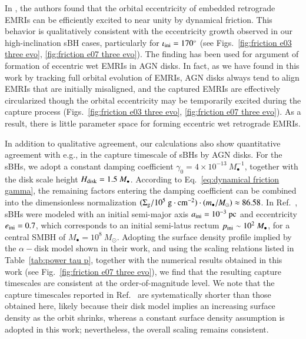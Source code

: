 \documentclass[aps,prx,reprint,superscriptaddress,nofootinbib,longbibliography]{revtex4-1}
\begin{document}
In \cite{Secunda_2021},  the authors found that the orbital eccentricity of embedded retrograde EMRIs can be efficiently excited to near unity by dynamical friction. This behavior is qualitatively consistent with the eccentricity growth observed in our high-inclination sBH cases, particularly for $\iota_{\rm ini}=170^{\circ}$ (see Figs.~\ref{fig:friction e03 three evo}, \ref{fig:friction e07 three evo}).
The finding has been used for argument of formation of eccentric wet EMRIs in AGN disks. In fact, as we have found in this work by tracking full orbital evolution of EMRIs,  AGN disks always tend to align EMRIs that are initially misaligned, and the captured EMRIs are effectively circularized though the orbital eccentricity may be temporarily excited during the capture process (Figs.~\ref{fig:friction e03 three evo}, \ref{fig:friction e07 three evo}).  As a result, there is little parameter space for forming eccentric wet retrograde EMRIs. 
\par
In addition to qualitative agreement, our calculations also show quantitative agreement with \cite{Wang2024} e.g., in the capture timescale of sBHs by AGN disks. 
For the sBHs, we adopt a constant damping coefficient $\gamma_{0}=4\times 10^{-13}\ M_{\bullet}^{-1}$, together with the disk scale height $H_{\rm disk}=1.5\ M_{\bullet}$. According to Eq.~\eqref{eq:dynamical friction gamma}, the remaining factors entering the damping coefficient can be combined into the dimensionless normalization $(\Sigma_{\rm g}/10^5\ \mathrm{g\cdot cm^{-2}})\cdot(m_{\bullet}/M_{\odot})\approx 86.58$. In Ref.~\cite{Wang2024}, sBHs were modeled with an initial semi-major axis $a_{\rm ini}=10^{-3}\ \mathrm{pc}$ and eccentricity $e_{\rm ini}=0.7$, which corresponds to an initial semi-latus rectum $p_{\rm ini}\sim 10^2\ M_{\bullet}$, for a central SMBH of $M_{\bullet}=10^{8}\ M_{\odot}$.
Adopting the surface density profile implied by the $\alpha-$disk model shown in their work, and using the scaling relations listed in Table~\ref{tab:power tau p}, together with the numerical results obtained in this work (see Fig.~\ref{fig:friction e07 three evo}), we find that the resulting capture timescales are consistent at the order-of-magnitude level. We note that the capture timescales reported in Ref.~\cite{Wang2024} are systematically shorter than those obtained here, likely because their disk model implies an increasing surface density as the orbit shrinks, whereas a constant surface density assumption is adopted in this work; nevertheless, the overall scaling remains consistent.
\end{document}
